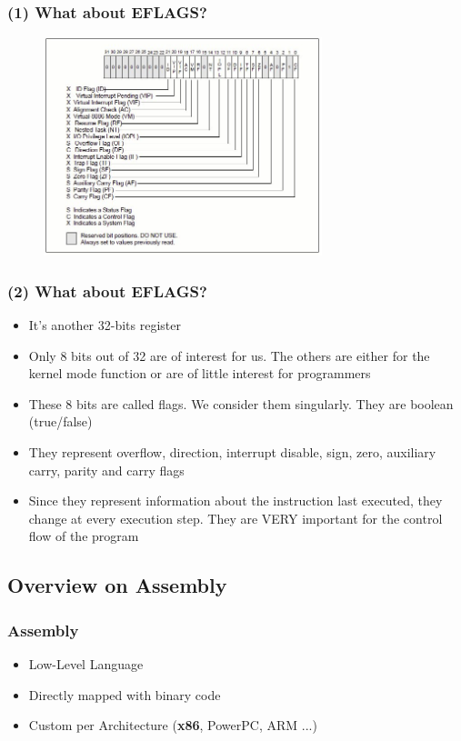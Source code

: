 \documentclass[]{beamer}
\begin{document}
\begin{frame}
  \frametitle{(1) What about EFLAGS?}
  \begin{figure}
    \includegraphics[height=2.5in]{images/eflags.jpeg}
    \label{Eflags idea}
  \end{figure}
\end{frame}
\begin{frame}
  \frametitle{(2) What about EFLAGS?}
  \begin{itemize}
  \item{It's another 32-bits register}
  \item{Only 8 bits out of 32 are of interest for us. The others are either for the kernel mode function or  are of little interest for programmers}
  \item{These 8 bits are called flags. We consider them singularly. They are boolean (true/false) }
  \item{They represent overflow, direction, interrupt disable, sign, zero, auxiliary carry, parity and carry flags}
  \item{Since they represent information about the instruction last executed, they change at every execution step. They are VERY important for the control flow of the program}
  \end{itemize}
\end{frame}


\subsection{Overview on Assembly}
\begin{frame}
  \frametitle{Assembly}
  \begin{itemize}
  \item{Low-Level Language}
  \item{Directly mapped with binary code}
  \item{Custom per Architecture ({\bf x86}, PowerPC, ARM ...)}
  \end{itemize}
\end{frame}
\end{document}
